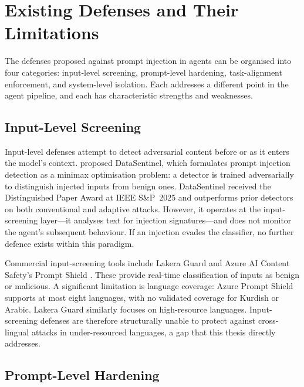 \section{Existing Defenses and Their Limitations}
\label{sec:existing_defenses}

The defenses proposed against prompt injection in agents can be organised into four categories: input-level screening, prompt-level hardening, task-alignment enforcement, and system-level isolation.  Each addresses a different point in the agent pipeline, and each has characteristic strengths and weaknesses.

\subsection{Input-Level Screening}

Input-level defenses attempt to detect adversarial content before or as it enters the model's context.  \textcite{liu2025datasentinel} proposed DataSentinel, which formulates prompt injection detection as a minimax optimisation problem: a detector is trained adversarially to distinguish injected inputs from benign ones.  DataSentinel received the Distinguished Paper Award at IEEE S\&P~2025 and outperforms prior detectors on both conventional and adaptive attacks.  However, it operates at the input-screening layer---it analyses text for injection signatures---and does not monitor the agent's subsequent behaviour.  If an injection evades the classifier, no further defence exists within this paradigm.

Commercial input-screening tools include Lakera Guard \parencite{lakera2024guard} and Azure AI Content Safety's Prompt Shield \parencite{microsoft2024promptshield}.  These provide real-time classification of inputs as benign or malicious.  A significant limitation is language coverage: Azure Prompt Shield supports at most eight languages, with no validated coverage for Kurdish or Arabic.  Lakera Guard similarly focuses on high-resource languages.  Input-screening defenses are therefore structurally unable to protect against cross-lingual attacks in under-resourced languages, a gap that this thesis directly addresses.

\subsection{Prompt-Level Hardening}

